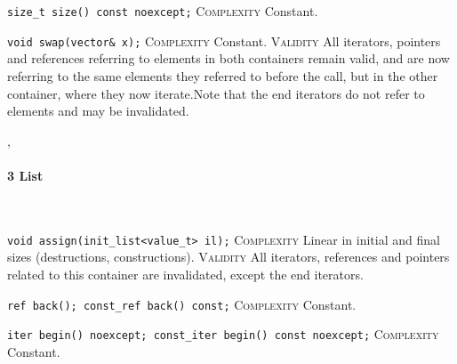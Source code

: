 \noindent{}\hspace*{0.25em}\lstinline[basicstyle=\ttfamily\color{cgreen}]{size_t size() const noexcept;} \textsc{Complexity} Constant.\\\vspace{-0.6em}

\noindent{}\hspace*{0.25em}\lstinline[basicstyle=\ttfamily\color{cgreen}]{void swap(vector& x);} \textsc{Complexity} Constant. \textsc{Validity} All iterators, pointers and references referring to elements in both containers remain valid, and are now referring to the same elements they referred to before the call, but in the other container, where they now iterate.Note that the end iterators do not refer to elements and may be invalidated.\\\vspace{-0.6em}


\sep
{}
\paragraph{3 List}\mbox{}\vspace{0.5em}\\
\noindent{}\hspace*{0.25em}\lstinline[basicstyle=\ttfamily\color{corange}]{void assign(init_list<value_t> il);} \textsc{Complexity} Linear in initial and final sizes (destructions, constructions). \textsc{Validity} All iterators, references and pointers related to this container are invalidated, except the end iterators.\\\vspace{-0.6em}

\noindent{}\hspace*{0.25em}\lstinline[basicstyle=\ttfamily\color{cgreen}]{ref back(); const_ref back() const;} \textsc{Complexity} Constant.\\\vspace{-0.6em}

\noindent{}\hspace*{0.25em}\lstinline[basicstyle=\ttfamily\color{cgreen}]{iter begin() noexcept; const_iter begin() const noexcept;} \textsc{Complexity} Constant.\\\vspace{-0.6em}

